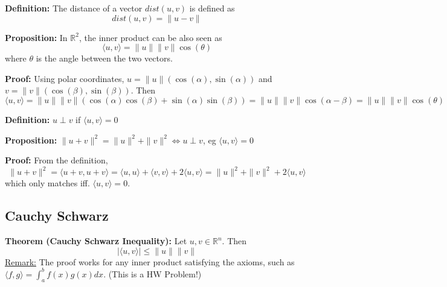 \documentclass{article}
\newcommand*{\iprod}[1]{\langle #1 \rangle}
\newcommand*{\rr}{\mathbb{R}}%
\begin{document}
\textbf{Definition:} The distance of a vector $dist(u,v)$ is defined as \[
    dist(u,v) = \|u-v\|
\]

\textbf{Proposition:} In $\rr^2$, the inner product can be also seen as \[
    \iprod{u,v} = \|u\|\|v\|\cos(\theta)
\]
where $\theta$ is the angle between the two vectors.
\begin{center}
\end{center}


\textbf{Proof:} Using polar coordinates, $u=\|u\|(\cos(\alpha), \sin(\alpha))$ and $v=\|v\|(\cos(\beta), \sin(\beta))$. Then \[
    \iprod{u,v} = \|u\|\|v\|(\cos(\alpha)\cos(\beta) + \sin(\alpha)\sin(\beta)) = \|u\|\|v\|\cos(\alpha-\beta)=\|u\|\|v\|\cos(\theta)
\]

\textbf{Definition:} $u\perp v$ if $\iprod{u,v}=0$

\textbf{Proposition:} $\|u+v\|^2 = \|u\|^2 + \|v\|^2 \iff u\perp v$, eg $\iprod{u,v}=0$

\textbf{Proof:} From the definition, \[
    \|u+v\|^2 = \iprod{u+v,u+v} = \iprod{u,u} + \iprod{v,v} + 2\iprod{u,v} = \|u\|^2 + \|v\|^2 + 2\iprod{u,v}
\]
which only matches iff. $\iprod{u,v}=0$.

\subsection{Cauchy Schwarz}
\textbf{Theorem (Cauchy Schwarz Inequality):} Let $u,v\in\rr^n$. Then \[
    |\iprod{u,v}| \leq \|u\|\|v\|
\]
\underline{Remark:} The proof works for any inner product satisfying the axioms, such as $\iprod{f,g}=\int_a^b f(x)g(x)dx$. (This is a HW Problem!)
\end{document}
